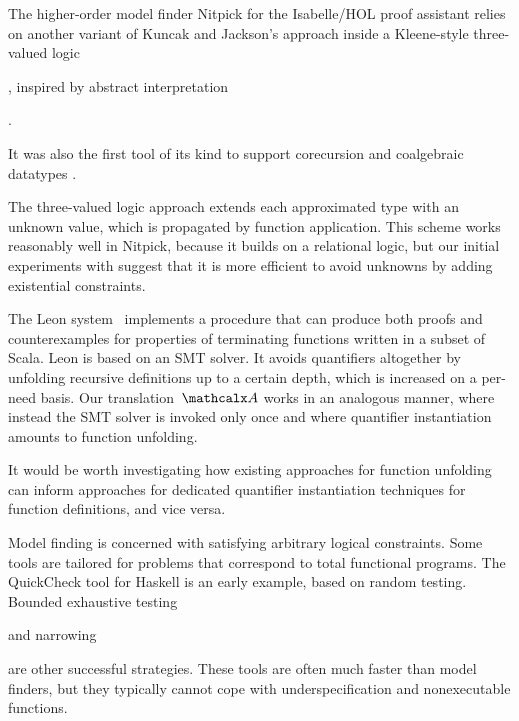 The higher-order model finder Nitpick \cite{blanchette-nipkow-2010}
for the Isabelle/HOL proof assistant
relies on another variant of Kuncak and Jackson's approach inside a
Kleene-style three-valued logic\begin{longv}, inspired by abstract interpretation\end{longv}.
\begin{longv}It was also the first tool of its kind to support corecursion and
coalgebraic datatypes \cite{blanchette-2013-relational}.\end{longv}
The three-valued logic approach extends each
approximated type with an unknown value, which is propagated by function
application. This scheme works reasonably well in Nitpick, because it builds
on a relational logic, but our initial experiments with \cvc suggest
that it is more efficient to avoid unknowns by adding existential
constraints.

The Leon system~\cite{blanc2013overview} implements a procedure that can
produce both proofs and counter\-examples for properties of terminating functions
written in a subset of Scala. Leon is based on an SMT solver. It avoids
quantifiers altogether by unfolding recursive definitions up to a certain
depth, which is increased on a per-need basis.
Our translation~$\conv$ works in an analogous manner, 
where instead the SMT solver is invoked only once 
and where quantifier instantiation amounts to function unfolding.
\begin{longv}It would be
worth investigating how existing approaches for function
unfolding can inform approaches for dedicated quantifier instantiation
techniques for function definitions, and vice versa.\end{longv}

Model finding is concerned with satisfying arbitrary logical constraints. Some
tools are tailored for problems that correspond to total functional
programs. The QuickCheck tool for Haskell \cite{claessen-hughes-2000} is an
early example, based on random testing. Bounded exhaustive testing\begin{longv}
\cite{runciman-et-al-2008}\end{longv} and narrowing\begin{longv}
\cite{lindblad-2008-testing}\end{longv} are other successful strategies. These
tools are often much faster than model finders, but they typically cannot cope
with underspecification and nonexecutable functions.



